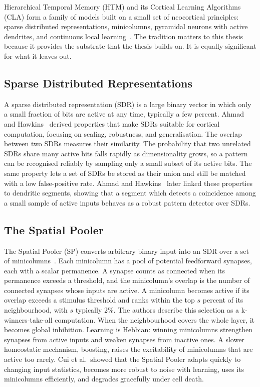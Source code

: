 Hierarchical Temporal Memory (HTM) and its Cortical Learning Algorithms (CLA)
form a family of models built on a small set of neocortical principles: sparse
distributed representations, minicolumns, pyramidal neurons with active
dendrites, and continuous local learning~\cite{hawkins2011cla}. The tradition
matters to this thesis because it provides the substrate that the thesis builds
on. It is equally significant for what it leaves out.

\subsection{Sparse Distributed Representations}
\label{subsec:comp-sdr}

A sparse distributed representation (SDR) is a large binary vector in which
only a small fraction of bits are active at any time, typically a few percent.
Ahmad and Hawkins~\cite{ahmad2015sdr} derived properties that make SDRs
suitable for cortical computation, focusing on scaling, robustness, and
generalisation. The overlap between two SDRs measures their similarity. The
probability that two unrelated SDRs share many active bits falls rapidly as
dimensionality grows, so a pattern can be recognised reliably by sampling only
a small subset of its active bits. The same property lets a set of SDRs be
stored as their union and still be matched with a low false-positive rate.
Ahmad and Hawkins~\cite{ahmad2016sdr} later linked these properties to
dendritic segments, showing that a segment which detects a coincidence among a
small sample of active inputs behaves as a robust pattern detector over SDRs.

\subsection{The Spatial Pooler}
\label{subsec:comp-sp}

The Spatial Pooler (SP) converts arbitrary binary input into an SDR over a set
of minicolumns~\cite{cui2017sp}. Each minicolumn has a pool of potential
feedforward synapses, each with a scalar permanence. A synapse counts as
connected when its permanence exceeds a threshold, and the minicolumn's overlap
is the number of connected synapses whose inputs are active. A minicolumn
becomes active if its overlap exceeds a stimulus threshold and ranks within the
top $s$ percent of its neighbourhood, with $s$ typically 2\%. The authors
describe this selection as a k-winners-take-all computation. When the
neighbourhood covers the whole layer, it becomes global inhibition. Learning is
Hebbian: winning minicolumns strengthen synapses from active inputs and weaken
synapses from inactive ones. A slower homeostatic mechanism, boosting, raises
the excitability of minicolumns that are active too rarely. Cui et al.\ showed
that the Spatial Pooler adapts quickly to changing input statistics, becomes
more robust to noise with learning, uses its minicolumns efficiently, and
degrades gracefully under cell death.

